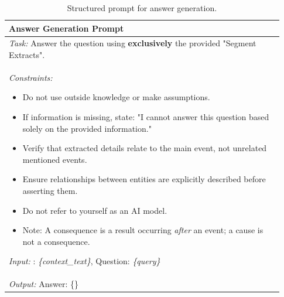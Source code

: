 \documentclass[11pt]{article}
\begin{document}
\begin{table}[t]
    \centering
    \footnotesize
    \caption{Structured prompt for answer generation.}
    \label{tab:prompt_qa}
    {\ttfamily %
    \begin{tabular}{p{0.93\linewidth}}
        \hline
        \textbf{Answer Generation Prompt} \\
        \hline
        \textit{Task:} Answer the question using \textbf{exclusively} the provided "Segment Extracts".\\
        \textit{Constraints:}
        \begin{itemize}[leftmargin=*,noitemsep,topsep=2pt]
            \item Do not use outside knowledge or make assumptions.
            \item If information is missing, state: "I cannot answer this question based solely on the provided information."
            \item Verify that extracted details relate to the main event, not unrelated mentioned events.
            \item Ensure relationships between entities are explicitly described before asserting them.
            \item Do not refer to yourself as an AI model.
            \item Note: A consequence is a result occurring \textit{after} an event; a cause is not a consequence.
        \end{itemize}
        \textit{Input:} : \textit{\{context\_text\}}, Question: \textit{\{query\}}\\
        \textit{Output:} Answer: \{\}\\
        \hline
    \end{tabular}
    } %
\end{table}
\end{document}
